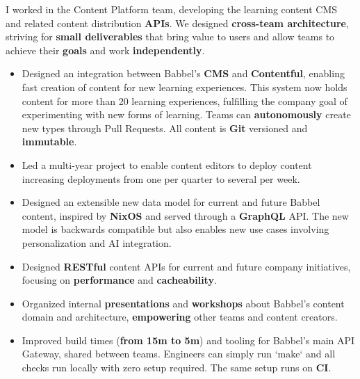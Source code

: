 \documentclass[10pt,a4paper,ragged2e,withhyper]{altacv}
\newcommand{\accentbold}[1]{\textbf{\textcolor{accent}{#1}}}
\begin{document}
\begin{paracol}{2}



{\RaggedRight
I worked in the Content Platform team, developing the learning content CMS and related content distribution \accentbold{APIs}. We designed \accentbold{cross-team architecture}, striving for \accentbold{small deliverables} that bring value to users and allow teams to achieve their \accentbold{goals} and work \accentbold{independently}.

\medskip

\begin{itemize}
\item Designed an integration between Babbel's \accentbold{CMS} and \accentbold{Contentful}, enabling fast creation of content for new learning experiences. This system now holds content for more than 20 learning experiences, fulfilling the company goal of experimenting with new forms of learning. Teams can \accentbold{autonomously} create new types through Pull Requests. All content is \accentbold{Git} versioned and \accentbold{immutable}.
\item Led a multi-year project to enable content editors to deploy content increasing deployments from one per quarter to several per week.
\item Designed an extensible new data model for current and future Babbel content, inspired by \accentbold{NixOS} and served through a \accentbold{GraphQL} API. The new model is backwards compatible but also enables new use cases involving personalization and AI integration.
\item Designed \accentbold{RESTful} content APIs for current and future company initiatives, focusing on \accentbold{performance} and \accentbold{cacheability}.
\item Organized internal \accentbold{presentations} and \accentbold{workshops} about Babbel's content domain and architecture, \accentbold{empowering} other teams and content creators.
\item Improved build times (\accentbold{from 15m to 5m}) and tooling for Babbel's main API Gateway, shared between teams. Engineers can simply run `make` and all checks run locally with zero setup required. The same setup runs on \accentbold{CI}.

\end{itemize}}
\end{paracol}
\end{document}
